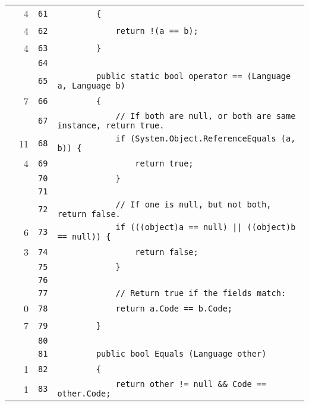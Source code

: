 \documentclass[a4paper,10pt]{article}
\begin{document}
\begin{longtable}[l]{lrrl}
\cellcolor{green} & 4 & \verb~61~ & \verb~        {~\\
\cellcolor{green} & 4 & \verb~62~ & \verb~            return !(a == b);~\\
\cellcolor{green} & 4 & \verb~63~ & \verb~        }~\\
\cellcolor{gray} &  & \verb~64~ & \verb~~\\
\cellcolor{gray} &  & \verb~65~ & \verb~        public static bool operator == (Language a, Language b)~\\
\cellcolor{green} & 7 & \verb~66~ & \verb~        {~\\
\cellcolor{gray} &  & \verb~67~ & \verb~            // If both are null, or both are same instance, return true.~\\
\cellcolor{green} & 11 & \verb~68~ & \verb~            if (System.Object.ReferenceEquals (a, b)) {~\\
\cellcolor{green} & 4 & \verb~69~ & \verb~                return true;~\\
\cellcolor{gray} &  & \verb~70~ & \verb~            }~\\
\cellcolor{gray} &  & \verb~71~ & \verb~~\\
\cellcolor{gray} &  & \verb~72~ & \verb~            // If one is null, but not both, return false.~\\
\cellcolor{green} & 6 & \verb~73~ & \verb~            if (((object)a == null) || ((object)b == null)) {~\\
\cellcolor{green} & 3 & \verb~74~ & \verb~                return false;~\\
\cellcolor{gray} &  & \verb~75~ & \verb~            }~\\
\cellcolor{gray} &  & \verb~76~ & \verb~~\\
\cellcolor{gray} &  & \verb~77~ & \verb~            // Return true if the fields match:~\\
\cellcolor{red} & 0 & \verb~78~ & \verb~            return a.Code == b.Code;~\\
\cellcolor{green} & 7 & \verb~79~ & \verb~        }~\\
\cellcolor{gray} &  & \verb~80~ & \verb~~\\
\cellcolor{gray} &  & \verb~81~ & \verb~        public bool Equals (Language other)~\\
\cellcolor{green} & 1 & \verb~82~ & \verb~        {~\\
\cellcolor{green} & 1 & \verb~83~ & \verb~            return other != null && Code == other.Code;~\\

\end{longtable}
\end{document}
